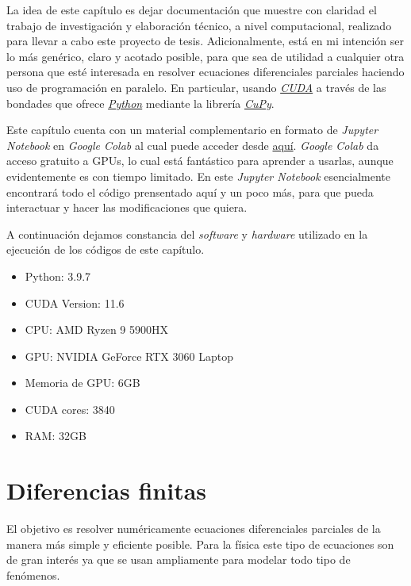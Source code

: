 \graphicspath{{figs/}}

La idea de este capítulo es dejar documentación que muestre con claridad el trabajo de investigación y elaboración técnico, a nivel computacional, realizado 
para llevar a cabo este proyecto de tesis. Adicionalmente, está en mi intención ser lo más genérico, claro y acotado posible, para que sea de utilidad a cualquier 
otra persona que esté interesada en resolver ecuaciones diferenciales parciales haciendo uso de programación en paralelo. En particular, usando 
\href{https://developer.nvidia.com/cuda-toolkit}{\textit{CUDA}} a través de las bondades que ofrece \href{https://www.python.org/}{\textit{Python}} mediante 
la librería \href{https://cupy.dev/}{\textit{CuPy}}.

Este capítulo cuenta con un material complementario en formato de \textit{Jupyter Notebook} en \textit{Google Colab} al cual puede acceder desde 
\href{https://colab.research.google.com/drive/13dfbe0GnIngJ2q3w2jLOlSO6mtFYZmA7?usp=sharing}{aquí}. \textit{Google Colab} da acceso gratuito a GPUs,
lo cual está fantástico para aprender a usarlas, aunque evidentemente es con tiempo limitado. En este \textit{Jupyter Notebook} esencialmente 
encontrará todo el código prensentado aquí y un poco más, para que pueda interactuar y hacer las modificaciones que quiera.

A continuación dejamos constancia del \textit{software} y \textit{hardware} utilizado en la ejecución de los códigos de este capítulo.

\begin{itemize}
  \item Python: 3.9.7
  \item CUDA Version: 11.6
  \item CPU: AMD Ryzen 9 5900HX
  \item GPU: NVIDIA GeForce RTX 3060 Laptop
  \item Memoria de GPU: 6GB
  \item CUDA cores: 3840
  \item RAM: 32GB
\end{itemize}

\section{Diferencias finitas}
\label{S:diferencias finitas}

El objetivo es resolver numéricamente ecuaciones diferenciales parciales de la manera más simple y eficiente posible. Para la física este tipo de ecuaciones son de gran 
interés ya que se usan ampliamente para modelar todo tipo de fenómenos. 

